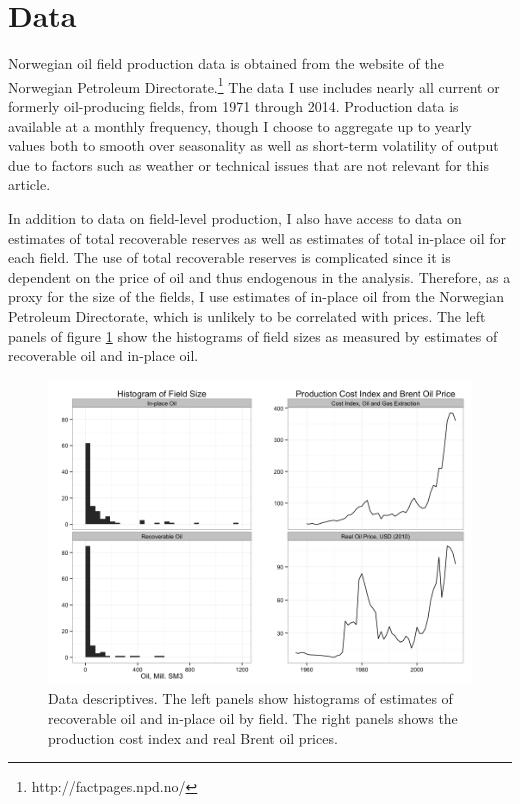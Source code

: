 \documentclass[12pt]{article}
\begin{document}
\section{Data}
Norwegian oil field production data is obtained from the website of the Norwegian Petroleum Directorate.\footnote{http://factpages.npd.no/} The data I use includes nearly all current or formerly oil-producing fields, from 1971 through 2014. Production data is available at a monthly frequency, though I choose to aggregate up to yearly values both to smooth over seasonality as well as short-term volatility of output due to factors such as weather or technical issues that are not relevant for this article. 

In addition to data on field-level production, I also have access to data on estimates of total recoverable reserves as well as estimates of total in-place oil for each field. The use of total recoverable reserves is complicated since it is dependent on the price of oil and thus endogenous in the analysis.  Therefore, as a proxy for the size of the fields, I use estimates of in-place oil from the Norwegian Petroleum Directorate, which is unlikely to be correlated with prices. The left panels of figure \ref{data_descriptives} show the histograms of field sizes as measured by estimates of recoverable oil and in-place oil. 

\begin{figure}
	\includegraphics[width=1\textwidth]{figures/data_descriptives.png}
	\caption{Data descriptives. The left panels show histograms of estimates of recoverable oil and in-place oil by field. The right panels shows the production cost index and real Brent oil prices.}
	\label{data_descriptives}
\end{figure}
\end{document}
